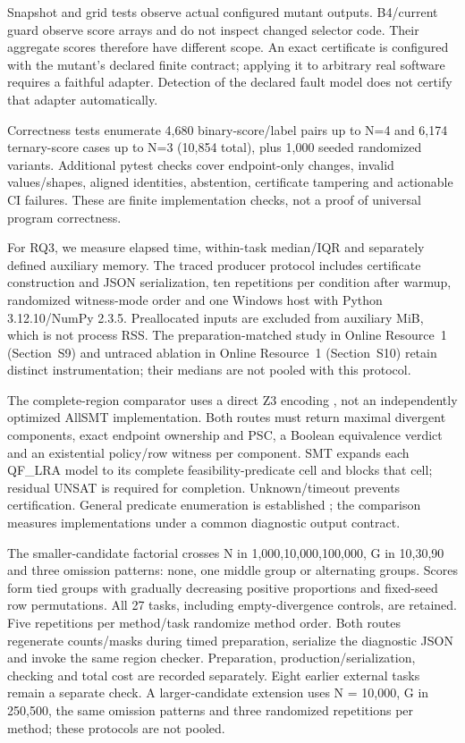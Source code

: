 \documentclass[11pt,a4paper]{article}
\theoremstyle{plain}
\theoremstyle{definition}
\theoremstyle{remark}
\begin{document}
Snapshot and grid tests observe actual configured mutant outputs. B4/current guard observe score arrays and do not inspect changed selector code. Their aggregate scores therefore have different scope. An exact certificate is configured with the mutant's declared finite contract; applying it to arbitrary real software requires a faithful adapter. Detection of the declared fault model does not certify that adapter automatically.

Correctness tests enumerate 4,680 binary-score/label pairs up to N=4 and 6,174 ternary-score cases up to N=3 (10{,}854 total), plus 1{,}000 seeded randomized variants. Additional pytest checks cover endpoint-only changes, invalid values/shapes, aligned identities, abstention, certificate tampering and actionable CI failures. These are finite implementation checks, not a proof of universal program correctness.

For RQ3, we measure elapsed time, within-task median/IQR and separately defined auxiliary memory. The traced producer protocol includes certificate construction and JSON serialization, ten repetitions per condition after warmup, randomized witness-mode order and one Windows host with Python 3.12.10/NumPy 2.3.5. Preallocated inputs are excluded from auxiliary MiB, which is not process RSS. The preparation-matched study in Online Resource~1 (Section~S9) and untraced ablation in Online Resource~1 (Section~S10) retain distinct instrumentation; their medians are not pooled with this protocol.

The complete-region comparator uses a direct Z3 encoding \cite{demoura2008z3}, not an independently optimized AllSMT implementation. Both routes must return maximal divergent components, exact endpoint ownership and PSC, a Boolean equivalence verdict and an existential policy/row witness per component. SMT expands each QF\_LRA model to its complete feasibility-predicate cell and blocks that cell; residual UNSAT is required for completion. Unknown/timeout prevents certification. General predicate enumeration is established \cite{mathsat_api,spallitta2025disjoint}; the comparison measures implementations under a common diagnostic output contract.

The smaller-candidate factorial crosses N in {1{,}000,10{,}000,100{,}000}, G in {10,30,90} and three omission patterns: none, one middle group or alternating groups. Scores form tied groups with gradually decreasing positive proportions and fixed-seed row permutations. All 27 tasks, including empty-divergence controls, are retained. Five repetitions per method/task randomize method order. Both routes regenerate counts/masks during timed preparation, serialize the diagnostic JSON and invoke the same region checker. Preparation, production/serialization, checking and total cost are recorded separately. Eight earlier external tasks remain a separate check. A larger-candidate extension uses N = 10{,}000, G in {250,500}, the same omission patterns and three randomized repetitions per method; these protocols are not pooled.
\end{document}

